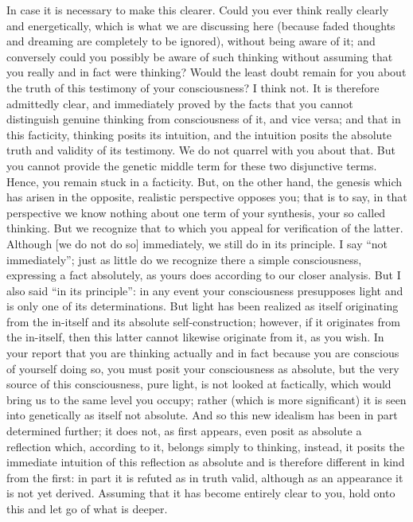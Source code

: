 In case it is necessary to make this clearer.
Could you ever think really clearly and energetically,
which is what we are discussing here
(because faded thoughts and dreaming are
completely to be ignored),
without being aware of it;
and conversely could you possibly be
aware of such thinking without assuming
that you really and in fact were thinking?
Would the least doubt remain for you about the truth
of this testimony of your consciousness?
I think not.
It is therefore admittedly clear,
and immediately proved by the facts
that you cannot distinguish genuine thinking
from consciousness of it, and vice versa;
and that in this facticity, thinking posits its intuition,
and the intuition posits the absolute
truth and validity of its testimony.
We do not quarrel with you about that.
But you cannot provide the genetic middle term
for these two disjunctive terms.
Hence, you remain stuck in a facticity.
But, on the other hand, the genesis
which has arisen in the opposite, realistic perspective opposes you;
that is to say, in that perspective we know nothing about
one term of your synthesis, your so called thinking.
But we recognize that to which you appeal
for verification of the latter.
Although [we do not do so] immediately,
we still do in its principle.
I say “not immediately”;
just as little do we recognize
there a simple consciousness,
expressing a fact absolutely,
as yours does according to our closer analysis.
But I also said “in its principle”:
in any event your consciousness presupposes light
and is only one of its determinations.
But light has been realized as itself originating from the in-itself
and its absolute self-construction;
however, if it originates from the in-itself,
then this latter cannot likewise originate from it, as you wish.
In your report that you are thinking actually and in fact
because you are conscious of yourself doing so,
you must posit your consciousness as absolute,
but the very source of this consciousness,
pure light, is not looked at factically,
which would bring us to the same level you occupy;
rather (which is more significant) it is
seen into genetically as itself not absolute.
And so this new idealism has been in part
determined further;
it does not, as first appears, even posit
as absolute a reflection which, according to it,
belongs simply to thinking, instead,
it posits the immediate intuition of this reflection as absolute
and is therefore different in kind from the first:
in part it is refuted as in truth valid,
although as an appearance it is not yet derived.
Assuming that it has become entirely clear to you,
hold onto this and let go of what is deeper.

